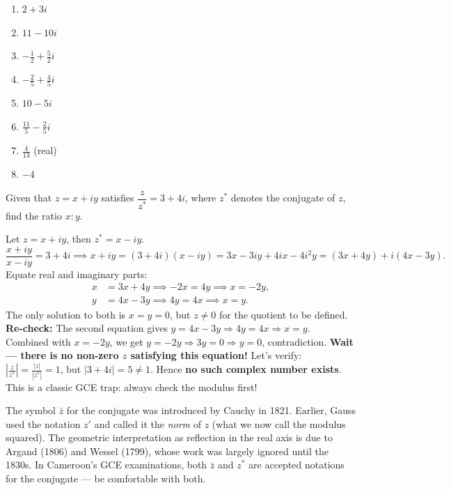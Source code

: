 \documentclass[11pt]{article}
\begin{document}
\begin{corrige}[Exercise 2.1]
\begin{enumerate}
\item $2+3i$
\item $11-10i$
\item $-\frac{1}{2}+\frac{5}{2}i$
\item $-\frac{2}{5}+\frac{4}{5}i$
\item $10-5i$
\item $\frac{11}{5}-\frac{2}{5}i$
\item $\frac{4}{13}$ (real)
\item $-4$
\end{enumerate}
\end{corrige}

\begin{exercice}
Given that $z = x+iy$ satisfies $\dfrac{z}{z^*} = 3+4i$, where $z^*$ denotes the conjugate of $z$, find the ratio $x:y$.
\end{exercice}

\begin{corrige}[Exercise 2.2]
Let $z=x+iy$, then $z^*=x-iy$.
\[
\frac{x+iy}{x-iy} = 3+4i
\implies x+iy = (3+4i)(x-iy) = 3x-3iy+4ix-4i^2y = (3x+4y) + i(4x-3y).
\]
Equate real and imaginary parts:
\begin{align*}
x &= 3x+4y \implies -2x = 4y \implies x = -2y,\\
y &= 4x-3y \implies 4y = 4x \implies x = y.
\end{align*}
The only solution to both is $x=y=0$, but $z\neq 0$ for the quotient to be defined. \textbf{Re-check:} The second equation gives $y=4x-3y \Rightarrow 4y=4x \Rightarrow x=y$. Combined with $x=-2y$, we get $y=-2y \Rightarrow 3y=0 \Rightarrow y=0$, contradiction. \textbf{Wait — there is no non-zero $z$ satisfying this equation!} Let's verify: $\left|\frac{z}{z^*}\right| = \frac{|z|}{|z^*|} = 1$, but $|3+4i|=5\neq 1$. Hence \textbf{no such complex number exists}. This is a classic GCE trap: always check the modulus first!
\end{corrige}

\begin{savaistu}
The symbol $\bar{z}$ for the conjugate was introduced by Cauchy in 1821. Earlier, Gauss used the notation $z'$ and called it the \emph{norm} of $z$ (what we now call the modulus squared). The geometric interpretation as reflection in the real axis is due to Argand (1806) and Wessel (1799), whose work was largely ignored until the 1830s. In Cameroon's GCE examinations, both $\bar{z}$ and $z^*$ are accepted notations for the conjugate — be comfortable with both.
\end{savaistu}
\end{document}
